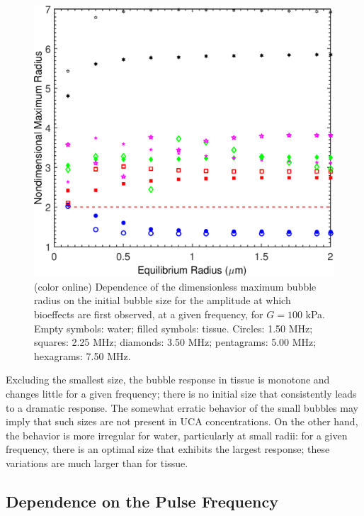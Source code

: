\begin{figure}[t]
    \includegraphics[width=\columnwidth]{./figs/bubble_figs/rstarmax_r0}
    \caption{(color online) Dependence of the dimensionless maximum bubble radius on
      the initial bubble size for the amplitude at which bioeffects
      are first observed, at a given frequency, for $G=100$ kPa. Empty
      symbols: water; filled symbols: tissue. Circles: 1.50 MHz; squares:
      2.25 MHz; diamonds: 3.50 MHz; pentagrams: 5.00 MHz; hexagrams: 7.50 MHz.}
    \label{figure:size}
\end{figure}

Excluding the smallest size, the bubble response in tissue is monotone
and changes little for a given frequency; there is no initial size
that consistently leads to a dramatic response. The somewhat erratic
behavior of the small bubbles may imply that such sizes are not
present in UCA concentrations. On the other hand, the behavior is more
irregular for water, particularly at small radii: for a given
frequency, there is an optimal size that exhibits the largest
response; these variations are much larger than for tissue.  








\subsection{Dependence on the Pulse Frequency}

